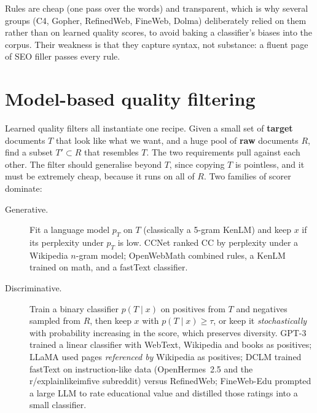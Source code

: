 Rules are cheap (one pass over the words) and transparent, which is why several groups
(C4, Gopher, RefinedWeb, FineWeb, Dolma) deliberately relied on them rather than on learned
quality scores, to avoid baking a classifier's biases into the corpus. Their weakness is that they
capture syntax, not substance: a fluent page of SEO filler passes every rule.

\section{Model-based quality filtering}\label{sec:data:quality}

Learned quality filters all instantiate one recipe. Given a small set of \textbf{target}
documents $T$ that look like what we want, and a huge pool of \textbf{raw} documents $R$, find a
subset $T'\subset R$ that resembles $T$. The two requirements pull against each other. The filter
should generalise beyond $T$, since copying $T$ is pointless, and it must be extremely cheap,
because it runs on all of $R$. Two families of scorer dominate:

\begin{description}
  \item[Generative.] Fit a language model $p_T$ on $T$ (classically a 5-gram KenLM) and keep $x$
  if its perplexity under $p_T$ is low. CCNet ranked CC by perplexity under a Wikipedia $n$-gram
  model; OpenWebMath combined rules, a KenLM trained on math, and a fastText classifier.
  \item[Discriminative.] Train a binary classifier $p(T\mid x)$ on positives from $T$ and negatives
  sampled from $R$, then keep $x$ with $p(T\mid x)\ge\tau$, or keep it \emph{stochastically}
  with probability increasing in the score, which preserves diversity. GPT-3 trained a linear
  classifier with WebText, Wikipedia and books as positives; LLaMA used pages \emph{referenced by}
  Wikipedia as positives; DCLM trained fastText on instruction-like data (OpenHermes~2.5 and the
  r/explainlikeimfive subreddit) versus RefinedWeb; FineWeb-Edu prompted a large LLM to rate
  educational value and distilled those ratings into a small classifier.
\end{description}


